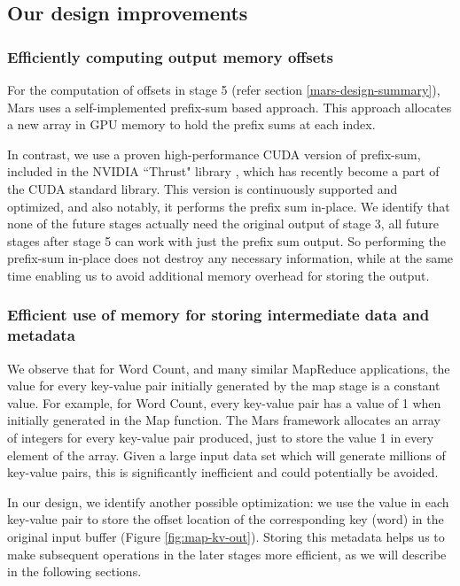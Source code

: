 \documentclass{article}
\begin{document}
\subsection{Our design improvements} \label{our-improved-design}
\subsubsection{Efficiently computing output memory offsets}
For the computation of offsets in stage 5 (refer section \ref{mars-design-summary}), Mars uses a self-implemented prefix-sum based approach. This approach allocates a new array in GPU memory to hold the prefix sums at each index.

In contrast, we use a proven high-performance CUDA version of prefix-sum, included in the NVIDIA ``Thrust" library \cite{nvidia_thrust}, which has recently become a part of the CUDA standard library. This version is continuously supported and optimized, and also notably, it performs the prefix sum in-place. We identify that none of the future stages actually need the original output of stage 3, all future stages after stage 5 can work with just the prefix sum output. So performing the prefix-sum in-place does not destroy any necessary information, while at the same time enabling us to avoid additional memory overhead for storing the output.

\subsubsection{Efficient use of memory for storing intermediate data and metadata} \label{efficient-metadata}
We observe that for Word Count, and many similar MapReduce applications, the value for every key-value pair initially generated by the map stage is a constant value. For example, for Word Count, every key-value pair has a value of 1 when initially generated in the Map function. The Mars framework allocates an array of integers for every key-value pair produced, just to store the value 1 in every element of the array. Given a large input data set which will generate millions of key-value pairs, this is significantly inefficient and could potentially be avoided. 

In our design, we identify another possible optimization: we use the value in each key-value pair to store the offset location of the corresponding key (word) in the original input buffer (Figure \ref{fig:map-kv-out}). Storing this metadata helps us to make subsequent operations in the later stages more efficient, as we will describe in the following sections. 
\end{document}
